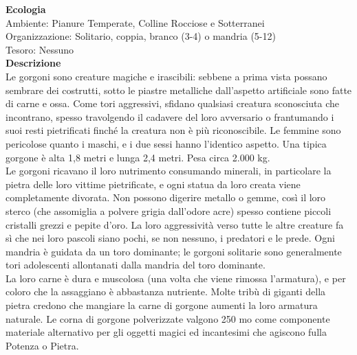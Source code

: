 \begin{multicols}{2}
\textbf{Ecologia}\\
Ambiente: Pianure Temperate, Colline Rocciose e Sotterranei\\
Organizzazione: Solitario, coppia, branco (3-4) o mandria (5-12)\\
Tesoro: Nessuno\\
\textbf{Descrizione}\\
Le gorgoni sono creature magiche e irascibili: sebbene a prima vista possano sembrare dei costrutti, sotto le piastre metalliche dall’aspetto artificiale sono fatte di carne e ossa. Come tori aggressivi, sfidano qualsiasi creatura sconosciuta che incontrano, spesso travolgendo il cadavere del loro avversario o frantumando i suoi resti pietrificati finché la creatura non è più riconoscibile. Le femmine sono pericolose quanto i maschi, e i due sessi hanno l’identico aspetto. Una tipica gorgone è alta 1,8 metri e lunga 2,4 metri. Pesa circa 2.000 kg.\\

Le gorgoni ricavano il loro nutrimento consumando minerali, in particolare la pietra delle loro vittime pietrificate, e ogni statua da loro creata viene completamente divorata. Non possono digerire metallo o gemme, così il loro sterco (che assomiglia a polvere grigia dall’odore acre) spesso contiene piccoli cristalli grezzi e pepite d’oro. La loro aggressività verso tutte le altre creature fa sì che nei loro pascoli siano pochi, se non nessuno, i predatori e le prede. Ogni mandria è guidata da un toro dominante; le gorgoni solitarie sono generalmente tori adolescenti allontanati dalla mandria del toro dominante.\\

La loro carne è dura e muscolosa (una volta che viene rimossa l’armatura), e per coloro che la assaggiano è abbastanza nutriente. Molte tribù di giganti della pietra credono che mangiare la carne di gorgone aumenti la loro armatura naturale. Le corna di gorgone polverizzate valgono 250 mo come componente materiale alternativo per gli oggetti magici ed incantesimi che agiscono fulla Potenza o Pietra.\\


\end{multicols}
